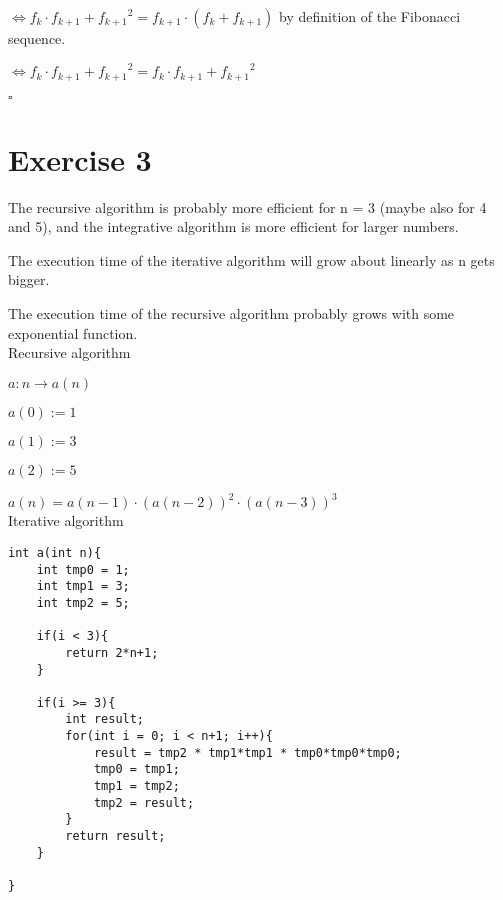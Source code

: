 \documentclass[a4paper,11pt]{article}
\newcommand*{\QEDB}{\hfill\ensuremath{\square}}%
\begin{document}
$\iff f_k \cdot f_{k+1} + {f_{k+1}}^2 = f_{k+1} \cdot (f_{k} + f_{k+1})$ by definition of the Fibonacci sequence.

$\iff f_k \cdot f_{k+1} + {f_{k+1}}^2 = f_{k} \cdot f_{k+1} + {f_{k+1}}^2$

\QEDB

\section*{Exercise 3}

The recursive algorithm is probably more efficient for n = 3 (maybe also for 4 and 5), and the integrative algorithm is more efficient for larger numbers.

The execution time of the iterative algorithm will grow about linearly as n gets bigger.

The execution time of the recursive algorithm probably grows with some exponential function.\\

\noindent Recursive algorithm

$a: n \to a(n)$

$a(0) := 1$

$a(1) := 3$

$a(2) := 5$

$a(n) = a(n-1) \cdot (a(n-2))^2 \cdot (a(n-3))^3$\\

\noindent Iterative algorithm

\begin{lstlisting}
int a(int n){
    int tmp0 = 1;
    int tmp1 = 3;
    int tmp2 = 5;
    
    if(i < 3){
        return 2*n+1;
    }
    
    if(i >= 3){
        int result;
        for(int i = 0; i < n+1; i++){
            result = tmp2 * tmp1*tmp1 * tmp0*tmp0*tmp0;
            tmp0 = tmp1;
            tmp1 = tmp2;
            tmp2 = result;
        }
        return result;
    }
    
}

\end{lstlisting}
\end{document}
